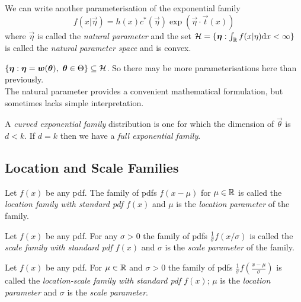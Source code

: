 \begin{definition}
    We can write another parameterisation of the exponential family
    \[
        f(x | \vec{\eta}) = h(x) c^{*}(\vec{\eta}) \exp(\vec{\eta} \cdot \vec{t}(x))
    \]
    where $\vec{\eta}$ is called the \emph{natural parameter} and the set $\mathcal{H}{} = \{\bm{\eta} : \int_{\mathbb{R}}{} f(x|\eta) \text{d} x < \infty \}$ is called the \emph{natural parameter space} and is convex.
\end{definition}

\begin{remark}
    $\{\bm{\eta}: \bm{\eta} = \bm{w}(\bm{\theta}), \,\, \bm{\theta} \in \Theta\} \subseteq \mathcal{H}{}$. So there may be more parameterisations here than previously.\\
    
The natural parameter provides a convenient mathematical formulation, but sometimes lacks simple interpretation.
\end{remark}

\begin{definition}
    A \emph{curved exponential family} distribution is one for which the dimension of $\vec{\theta}$ is $d < k$. If $d = k$ then we have a \emph{full exponential family}.
\end{definition}

\subsection{Location and Scale Families}

\begin{definition}
    Let $f(x)$ be any pdf. The family of pdfs $f(x - \mu)$ for $\mu \in \mathbb{R}{}$ is called the \emph{location family with standard pdf $f(x)$} and $\mu$ is the \emph{location parameter} of the family.
\end{definition}

\begin{definition}
    Let $f(x)$ be any pdf. For any $\sigma > 0$ the family of pdfs $\frac{1}{\sigma} f(x/\sigma)$ is called the \emph{scale family with standard pdf $f(x)$} and $\sigma$ is the \emph{scale parameter} of the family.
\end{definition}

\begin{definition}
    Let $f(x)$ be any pdf. For $\mu \in \mathbb{R}{}$ and $\sigma > 0$ the family of pdfs $\frac{1}{\sigma} f(\frac{x - \mu}{\sigma})$ is called the \emph{location-scale family with standard pdf $f(x)$}; $\mu$ is the \emph{location parameter} and $\sigma$ is the \emph{scale parameter}.
\end{definition}

